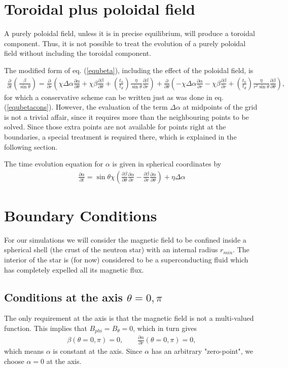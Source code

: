 \documentclass[letterpaper,10pt]{article}
\newcommand{\pp}{\partial}
\begin{document}
\section{Toroidal plus poloidal field}
A purely poloidal field, unless it is in precise equilibrium, will produce a toroidal component. Thus, it is not possible to treat the evolution of a purely poloidal field without including the toroidal component.

The modified form of eq. (\ref{equbeta}), including the effect of the poloidal field, is
\begin{eqnarray}
\frac{\pp}{\pp t}\left(\frac{\beta}{\sin\theta}\right)=\frac{\pp}{\pp r}\left(\chi\Delta\alpha\frac{\pp\alpha}{\pp\theta}+\chi\beta\frac{\pp \beta}{\pp\theta}+\left(\frac{t_h}{t_d}\right)\frac{\eta}{\sin\theta}\frac{\pp\beta}{\pp r}\right)+\frac{\pp}{\pp\theta}\left(-\chi\Delta\alpha\frac{\pp\alpha}{\pp r}-\chi\beta\frac{\pp\beta}{\pp r}+\left(\frac{t_h}{t_d}\right)\frac{\eta}{r^2\sin\theta}\frac{\pp\beta}{\pp\theta}\right),
\end{eqnarray}
for which a conservative scheme can be written just as was done in eq. (\ref{equbetacons}). However, the evaluation of the term $\Delta\alpha$ at midpoints of the grid is not a trivial affair, since it requires more than the neighbouring points to be solved. Since those extra points are not available for points right at the boundaries,  a special treatment is required there, which is explained in the following section.

The time evolution equation for $\alpha$ is given in spherical coordinates by
\begin{eqnarray}
\frac{\pp\alpha}{\pp t}=\sin\theta\chi\left(\frac{\pp\beta}{\pp\theta}\frac{\pp \alpha}{\pp r}-\frac{\pp\beta}{\pp r}\frac{\pp \alpha}{\pp \theta}\right)+\eta\Delta\alpha
\end{eqnarray}
\section{Boundary Conditions}
For our simulations we will consider the magnetic field to be confined inside a spherical shell (the crust of the neutron star) with an internal radius $r_{min}$. The interior of the star is (for now) considered to be a superconducting fluid which has completely expelled all its magnetic flux.
\subsection{Conditions at the axis $\theta=0,\pi$}
The only requirement at the axis is that the magnetic field is not a multi-valued function. This implies that $B_{phi}=B_{\theta}=0$, which in turn gives
\begin{eqnarray}
\beta(\theta=0,\pi)=0,\qquad \frac{\pp\alpha}{\pp r}(\theta=0,\pi)=0,
\end{eqnarray}
which means $\alpha$ is constant at the axis. Since $\alpha$ has an arbitrary "zero-point", we choose $\alpha=0$ at the axis.
\end{document}
